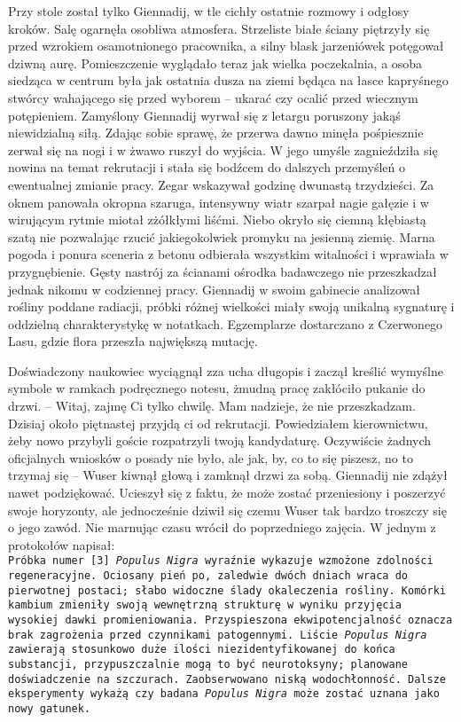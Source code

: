 \documentclass[../MAIN.tex]{subfiles}
\begin{document}
Przy stole został tylko Giennadij, w tle cichły ostatnie rozmowy i odgłosy kroków. Salę ogarnęła osobliwa atmosfera. Strzeliste białe ściany piętrzyły się przed wzrokiem osamotnionego pracownika, a silny blask jarzeniówek potęgował dziwną aurę. Pomieszczenie wyglądało teraz jak wielka poczekalnia, a osoba siedząca w centrum była jak ostatnia dusza na ziemi będąca na łasce kapryśnego stwórcy wahającego się przed wyborem -- ukarać czy ocalić przed wiecznym potępieniem. Zamyślony Giennadij wyrwał się z letargu poruszony jakąś niewidzialną siłą. Zdając sobie sprawę, że przerwa dawno minęła pośpiesznie zerwał się na nogi i w żwawo ruszył do wyjścia. W jego umyśle zagnieździła się nowina na temat rekrutacji i stała się bodźcem do dalszych przemyśleń o ewentualnej zmianie pracy. Zegar wskazywał godzinę dwunastą trzydzieści.
%
\clearpage
{}  
% 
Za oknem panowała okropna szaruga, intensywny wiatr szarpał nagie gałęzie i w wirującym rytmie miotał zżółkłymi liśćmi. Niebo okryło się ciemną kłębiastą szatą nie pozwalając rzucić jakiegokolwiek promyku na jesienną ziemię. Marna pogoda i ponura sceneria z betonu odbierała wszystkim witalności i wprawiała w przygnębienie. Gęsty nastrój za ścianami ośrodka badawczego nie przeszkadzał jednak nikomu w codziennej pracy. Giennadij w swoim gabinecie analizował rośliny poddane radiacji, próbki różnej wielkości miały swoją unikalną sygnaturę i oddzielną charakterystykę w notatkach. Egzemplarze dostarczano z Czerwonego Lasu, gdzie flora przeszła największą mutację. 

Doświadczony naukowiec wyciągnął zza ucha długopis i zaczął kreślić wymyślne symbole w ramkach podręcznego notesu, żmudną pracę zakłóciło pukanie do drzwi. 
-- Witaj, zajmę Ci tylko chwilę. Mam nadzieje, że nie przeszkadzam. Dzisiaj około piętnastej przyjdą ci od rekrutacji. Powiedziałem kierownictwu, żeby nowo przybyli goście rozpatrzyli twoją kandydaturę. Oczywiście żadnych oficjalnych wniosków o posady nie było, ale jak, by, co to się piszesz, no to trzymaj się -- Wuser kiwnął głową i zamknął drzwi za sobą. 
Giennadij nie zdążył nawet podziękować. Ucieszył się z faktu, że może zostać przeniesiony i poszerzyć swoje horyzonty, ale jednocześnie dziwił się czemu Wuser tak bardzo troszczy się o jego zawód. Nie marnując czasu wrócił do poprzedniego zajęcia. W jednym z protokołów napisał:\\
% 
\texttt{Próbka numer [3] \textit{Populus Nigra} wyraźnie wykazuje wzmożone zdolności regeneracyjne. Ociosany pień po, zaledwie dwóch dniach wraca do pierwotnej postaci; słabo widoczne ślady okaleczenia rośliny. Komórki kambium zmieniły swoją wewnętrzną strukturę w wyniku przyjęcia wysokiej dawki promieniowania. Przyspieszona ekwipotencjalność oznacza brak zagrożenia przed czynnikami patogennymi. Liście \textit{Populus Nigra} zawierają stosunkowo duże ilości niezidentyfikowanej do końca substancji, przypuszczalnie mogą to być neurotoksyny; planowane doświadczenie na szczurach. Zaobserwowano niską wodochłonność. Dalsze eksperymenty wykażą czy badana \textit{Populus Nigra} może zostać uznana jako nowy gatunek.} 
\end{document}
